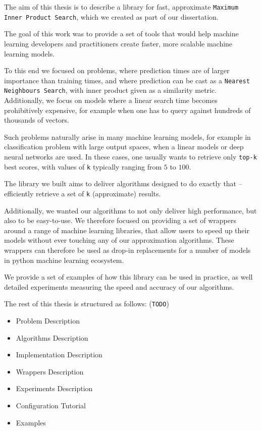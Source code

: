 The aim of this thesis is to describe a library for fast, approximate \texttt{Maximum Inner Product Search}, 
which we created as part of our dissertation. 

The goal of this work was to provide a set of tools that would help machine learning developers and practitioners create faster, 
more scalable machine learning models.

To this end we focused on problems, where prediction times are of larger importance than training times, and where prediction can be 
cast as a \texttt{Nearest Neighbours Search}, with inner product given as a similarity metric. Additionally, we focus 
on models where a linear search time becomes prohibitively expensive, for example when one has to query against hundreds of thousands of vectors.

Such problems naturally arise in many machine learning models, for example in classification problem with large output spaces, 
when a linear models or deep neural networks are used. In these cases, one usually wants to retrieve only \texttt{top-k} best scores, with values 
of \texttt{k} typically ranging from $5$ to $100$.

The library we built aims to deliver algorithms designed to do exactly that -- efficiently retrieve a set of \texttt{k} (approximate) results. 

Additionally, we wanted our algorithms to not only deliver high performance, but also to be easy-to-use. We therefore 
focused on providing a set of wrappers around a range of machine learning libraries, that allow users to 
speed up their models without ever touching any of our approximation algorithms. These wrappers can therefore be used as drop-in replacements for a number of models in python machine learning ecosystem.

We provide a set of examples of how this library can be used in practice, as well detailed experiments measuring the speed and 
accuracy of our algorithms.

The rest of this thesis is structured as follows: (\texttt{TODO})

\begin{itemize}
    \item Problem Description
    \item Algorithms Description
    \item Implementation Description
    \item Wrappers Description
    \item Experiments Description
    \item Configuration Tutorial
    \item Examples
\end{itemize}
